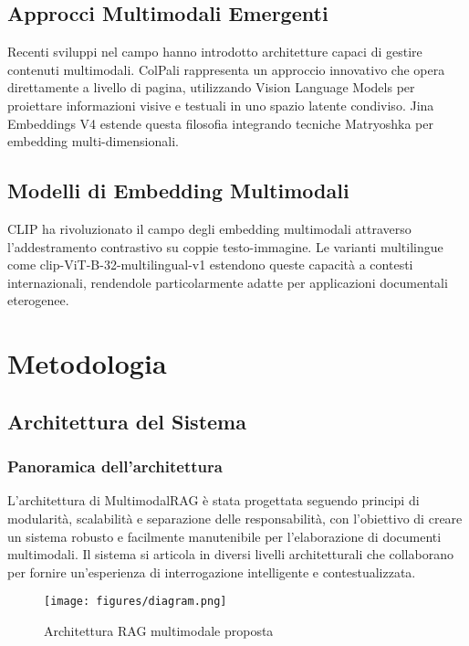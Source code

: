 \documentclass[12pt,a4paper]{article}
\begin{document}
\subsection{Approcci Multimodali Emergenti}
Recenti sviluppi nel campo hanno introdotto architetture capaci di gestire contenuti multimodali. ColPali \cite{colpali2024} rappresenta un approccio innovativo che opera direttamente a livello di pagina, utilizzando Vision Language Models per proiettare informazioni visive e testuali in uno spazio latente condiviso. Jina Embeddings V4 \cite{jina2024} estende questa filosofia integrando tecniche Matryoshka per embedding multi-dimensionali.

\subsection{Modelli di Embedding Multimodali}
CLIP \cite{radford2021learning} ha rivoluzionato il campo degli embedding multimodali attraverso l'addestramento contrastivo su coppie testo-immagine. Le varianti multilingue come clip-ViT-B-32-multilingual-v1 estendono queste capacità a contesti internazionali, rendendole particolarmente adatte per applicazioni documentali eterogenee.

\section{Metodologia}

\subsection{Architettura del Sistema}

\subsubsection{Panoramica dell'architettura}
L'architettura di MultimodalRAG è stata progettata seguendo principi di modularità, scalabilità e separazione delle responsabilità, con l'obiettivo di creare un sistema robusto e facilmente manutenibile per l'elaborazione di documenti multimodali. Il sistema si articola in diversi livelli architetturali che collaborano per fornire un'esperienza di interrogazione intelligente e contestualizzata.

\begin{figure}[!ht]
\centering
\texttt{[image: figures/diagram.png]}
\caption{Architettura RAG multimodale proposta}
\label{fig:architecture}
\end{figure}
\end{document}
